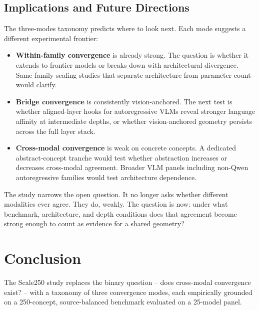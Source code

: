 \documentclass[10pt]{article}
\providecommand{\tightlist}{%
  \setlength{\itemsep}{0pt}\setlength{\parskip}{0pt}}
\begin{document}
\subsection{Implications and Future
Directions}\label{implications-and-future-directions}

The three-modes taxonomy predicts where to look next. Each mode suggests
a different experimental frontier:

\begin{itemize}
\tightlist
\item
  \textbf{Within-family convergence} is already strong. The question is
  whether it extends to frontier models or breaks down with
  architectural divergence. Same-family scaling studies that separate
  architecture from parameter count would clarify.
\item
  \textbf{Bridge convergence} is consistently vision-anchored. The next
  test is whether aligned-layer hooks for autoregressive VLMs reveal
  stronger language affinity at intermediate depths, or whether
  vision-anchored geometry persists across the full layer stack.
\item
  \textbf{Cross-modal convergence} is weak on concrete concepts. A
  dedicated abstract-concept tranche would test whether abstraction
  increases or decreases cross-modal agreement. Broader VLM panels
  including non-Qwen autoregressive families would test architecture
  dependence.
\end{itemize}

The study narrows the open question. It no longer asks whether different
modalities ever agree. They do, weakly. The question is now: under what
benchmark, architecture, and depth conditions does that agreement become
strong enough to count as evidence for a shared geometry?

\section{Conclusion}\label{conclusion}

The Scale250 study replaces the binary question -- does cross-modal
convergence exist? -- with a taxonomy of three convergence modes, each
empirically grounded on a 250-concept, source-balanced benchmark
evaluated on a 25-model panel.
\end{document}
